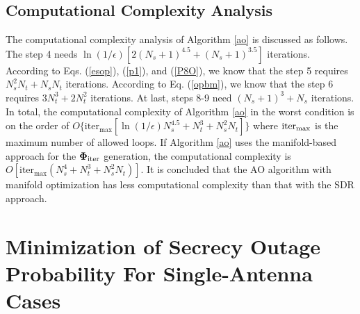 \documentclass[journal]{IEEEtran}
\theoremstyle{definition}
\begin{document}
\subsection{Computational Complexity Analysis}
The computational complexity analysis of Algorithm \ref{ao} is discussed as follows. The step 4 needs $\ln(1/\epsilon)[2(N_s+1)^{4.5}+(N_s+1)^{3.5}]$ iterations. According to Eqs. (\ref{esop}), (\ref{p1}), and (\ref{P8O}), we know that the step 5 requires $N_s^2N_t+N_sN_t$ iterations. According to Eq. (\ref{opbm}), we know that the step 6 requires $3N_t^3+2N_t^2$ iterations. At last, steps 8-9 need $(N_s+1)^3+N_s$ iterations. In total, the computational complexity of Algorithm \ref{ao} in the worst condition is on the order of $O\{\text{iter}_{\max}[\ln(1/\epsilon)N_s^{4.5}+N_t^3+N_s^2N_t]\}$ where $\rm{iter}_{\max}$ is the maximum number of allowed loops. If Algorithm \ref{ao} uses the manifold-based approach for the $\bm{\Phi}_{\rm{iter}}$ generation, the computational complexity is $O[\text{iter}_{\max}(N_s^4+N_t^3+N_s^2N_t)]$. It is concluded that the AO algorithm with manifold optimization has less computational complexity than that with the SDR approach.

\section{Minimization of Secrecy Outage Probability For Single-Antenna Cases}\label{scase}
\end{document}
